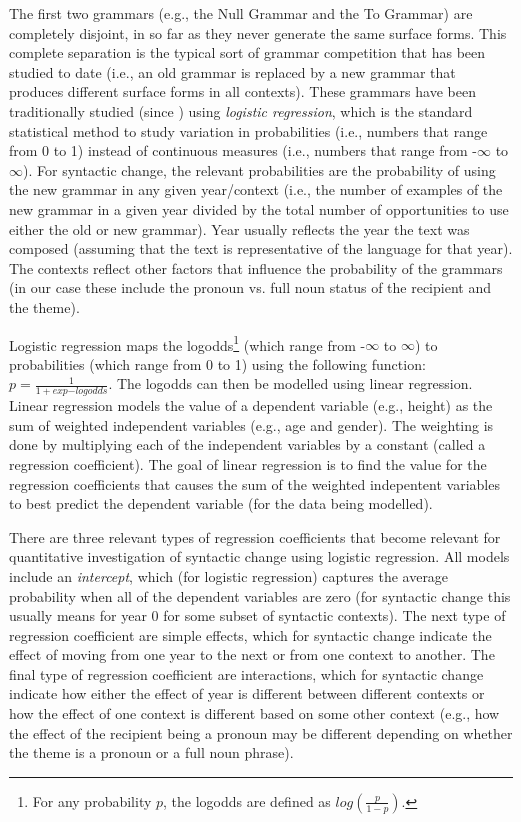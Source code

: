 	The first two grammars (e.g., the Null Grammar and the To Grammar) are completely disjoint, in so far as they never generate the same surface forms. This complete separation is the typical sort of grammar competition that has been studied to date (i.e., an old grammar is replaced by a new grammar that produces different surface forms in all contexts). These grammars have been traditionally studied (since \citealt{Kroch.1989}) using \textit{logistic regression}, which is the standard statistical method to study variation in probabilities (i.e., numbers that range from 0 to 1) instead of continuous measures (i.e., numbers that range from -$\infty$ to $\infty$). For syntactic change, the relevant probabilities are the probability of using the new grammar in any given year/context (i.e., the number of examples of the new grammar in a given year divided by the total number of opportunities to use either the old or new grammar). Year usually reflects the year the text was composed (assuming that the text is representative of the language for that year). The contexts reflect other factors that influence the probability of the grammars (in our case these include the pronoun vs. full noun status of the recipient and the theme).

	Logistic regression maps the logodds\footnote{For any probability $p$, the logodds are defined as $log(\frac{p}{1-p})$.} (which range from -$\infty$ to $\infty$) to probabilities (which range from 0 to 1) using the following function: $p=\frac{1}{1+exp{-logodds}}$. The logodds can then be modelled using linear regression. Linear regression models the value of a dependent variable (e.g., height) as the sum of weighted independent variables (e.g., age and gender). The weighting is done by multiplying each of the independent variables by a constant (called a regression coefficient). The goal of linear regression is to find the value for the regression coefficients that causes the sum of the weighted indepentent variables to best predict the dependent variable (for the data being modelled).

	There are three relevant types of regression coefficients that become relevant for quantitative investigation of syntactic change using logistic regression. All models include an \textit{intercept}, which (for logistic regression) captures the average probability when all of the dependent variables are zero (for syntactic change this usually means for year 0 for some subset of syntactic contexts). The next type of regression coefficient are simple effects, which for syntactic change indicate the effect of moving from one year to the next or from one context to another. The final type of regression coefficient are interactions, which for syntactic change indicate how either the effect of year is different between different contexts or how the effect of one context is different based on some other context (e.g., how the effect of the recipient being a pronoun may be different depending on whether the theme is a pronoun or a full noun phrase).


